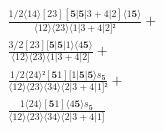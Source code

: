 \documentclass[varwidth, border=5pt]{standalone}
\begin{document}
\begin{my}
$\begin{gathered}
\scriptscriptstyle\frac{1/2⟨14⟩[23][𝟓|𝟓|3+4|2]⟨1𝟓⟩}{⟨12⟩⟨23⟩⟨1|3+4|2]²} +\\
\scriptscriptstyle\frac{3/2[23][𝟓|𝟓|1⟩⟨4𝟓⟩}{⟨12⟩⟨23⟩⟨1|3+4|2]} +\\
\scriptscriptstyle\frac{1/2⟨24⟩²[𝟓1][1|𝟓|𝟓⟩s_{𝟓}}{⟨12⟩⟨23⟩⟨34⟩⟨2|3+4|1]²} +\\
\scriptscriptstyle\frac{1⟨24⟩[𝟓1]⟨4𝟓⟩s_{𝟓}}{⟨12⟩⟨23⟩⟨34⟩⟨2|3+4|1]} \phantom{+}
\end{gathered}$
\end{my}
\end{document}
